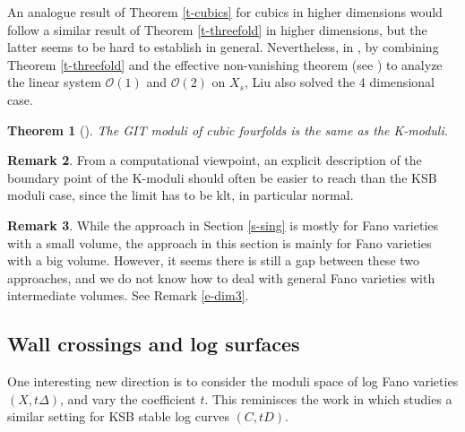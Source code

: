 \documentclass[12pt,reqno]{amsart}%
\newtheorem{thm}{Theorem}[section]
\theoremstyle{definition}
\newtheorem{rem}[thm]{Remark}
\theoremstyle{remark}
\begin{document}
An analogue result of Theorem \ref{t-cubics} for cubics in higher dimensions would follow a similar result of Theorem \ref{t-threefold} in higher dimensions, but the latter seems to be hard to establish in general. Nevertheless, in \cite{Liu20}, by combining Theorem \ref{t-threefold} and the effective non-vanishing theorem (see \cite{Kaw00}) to analyze the linear system $\mathcal{O}(1)$ and $\mathcal{O}(2)$ on $X_s$, Liu also solved the 4 dimensional case. 

\begin{thm}[\cite{Liu20}]\label{t-cubicfourfold}
The GIT moduli of cubic fourfolds is the same as the K-moduli.
\end{thm}


\begin{rem}From a computational viewpoint, an explicit description of the boundary point of the K-moduli should often be easier to reach than the KSB moduli case, since the limit has to be klt, in particular normal. 
\end{rem}

\begin{rem} While the approach in Section \ref{s-sing} is mostly for Fano varieties with a small volume, the approach in this section is mainly for Fano varieties with a big volume. However, it seems there is still a gap between these two approaches, and we do not know how to deal with general Fano varieties with intermediate volumes. See Remark \ref{e-dim3}.
\end{rem}

\subsection{Wall crossings and log surfaces}
One interesting new direction is to consider the moduli space of log Fano varieties $(X,t\Delta)$, and vary the coefficient $t$. This reminisces the work in \cite{Has03} which studies a similar setting for KSB stable log curves $(C,tD)$.
\end{document}
